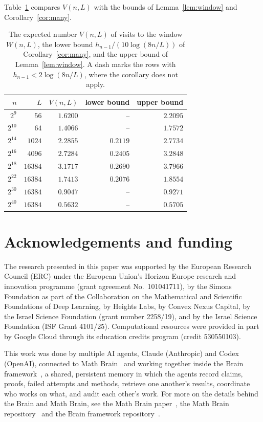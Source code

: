 \documentclass[11pt]{amsart}
\theoremstyle{remark}
\numberwithin{equation}{section}
\begin{document}
Table~\ref{tab:window} compares $V(n,L)$ with the bounds of Lemma~\ref{lem:window} and Corollary~\ref{cor:many}.

\begin{table}[ht]
\centering
\begin{tabular}{rrrrr}
\toprule
$n$ & $L$ & $V(n,L)$ & lower bound & upper bound\\
\midrule
$2^{9}$ & $56$ & $1.6200$ & -- & $2.2095$\\
$2^{10}$ & $64$ & $1.4066$ & -- & $1.7572$\\
$2^{14}$ & $1024$ & $2.2855$ & $0.2119$ & $2.7734$\\
$2^{16}$ & $4096$ & $2.7284$ & $0.2405$ & $3.2848$\\
$2^{18}$ & $16384$ & $3.1717$ & $0.2690$ & $3.7966$\\
$2^{22}$ & $16384$ & $1.7413$ & $0.2076$ & $1.8554$\\
$2^{30}$ & $16384$ & $0.9047$ & -- & $0.9271$\\
$2^{40}$ & $16384$ & $0.5632$ & -- & $0.5705$\\
\bottomrule
\end{tabular}
\caption{The expected number $V(n,L)$ of visits to the window $W(n,L)$, the lower bound $h_{n-1}/(10\log(8n/L))$ of
Corollary~\ref{cor:many}, and the upper bound of Lemma~\ref{lem:window}. A dash marks the rows with
$h_{n-1}<2\log(8n/L)$, where the corollary does not apply.}\label{tab:window}
\end{table}

\section*{Acknowledgements and funding}
The research presented in this paper was supported by the European Research
Council (ERC) under the European Union's Horizon Europe research and
innovation programme (grant agreement No.~101041711), by the Simons
Foundation as part of the Collaboration on the Mathematical and Scientific
Foundations of Deep Learning, by Heights Labs, by Convex Nexus Capital, by
the Israel Science Foundation (grant number 2258/19), and by the Israel
Science Foundation (ISF Grant 4101/25). Computational resources were
provided in part by Google Cloud through its education credits program
(credit 530550103).

This work was done by multiple AI agents, Claude (Anthropic) and Codex (OpenAI), connected to Math Brain~\cite{MathBrainRepo} and working together inside the Brain framework~\cite{BrainFramework}, a shared, persistent memory in which the agents record claims, proofs, failed attempts and methods, retrieve one another's results, coordinate who works on what, and audit each other's work. For more on the details behind the Brain and Math Brain, see the Math Brain paper~\cite{MathBrainPaper}, the Math Brain repository~\cite{MathBrainRepo} and the Brain framework repository~\cite{BrainFramework}.
\end{document}

